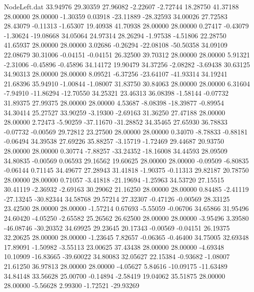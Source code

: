 \begin{filecontents}{NodeLeft.dat}
  33.94976   29.30359   27.96082    -2.22607   -2.72744   18.28750   41.37188   28.00000   28.00000   -1.30359    0.03918  -23.11889  -28.32593
  34.00026   27.72583   28.43079    -0.11313   -1.65307   19.40938   41.70938   28.00000   28.00000    0.27417   -0.43079   -1.30624  -19.08668
  34.05064   24.97314   28.26294    -1.97538   -4.51806   22.28750   41.65937   28.00000   28.00000    3.02686   -0.26294  -22.08108  -50.50358
  34.09109   22.08679   30.31006    -0.04151   -0.04151   26.32500   39.70312   28.00000   28.00000    5.91321   -2.31006   -0.45896   -0.45896
  34.14172   19.90479   34.37256    -2.08282   -3.69438   30.63125   34.90313   28.00000   28.00000    8.09521   -6.37256  -23.64107  -41.93314
  34.19241   21.68396   35.94910    -1.00844   -1.08007   31.83750   30.84063   28.00000   28.00000    6.31604   -7.94910  -11.86294  -12.70550
  34.25321   23.46313   36.08398    -1.58144   -0.07732   31.89375   27.99375   28.00000   28.00000    4.53687   -8.08398  -18.39877   -0.89954
  34.30414   25.27527   33.90259    -3.19300   -2.69163   31.36250   27.47188   28.00000   28.00000    2.72473   -5.90259  -37.11670  -31.28852
  34.35465   27.65930   36.78833    -0.07732   -0.00569   29.72812   23.27500   28.00000   28.00000    0.34070   -8.78833   -0.88181   -0.06494
  34.39538   27.69226   35.88257    -3.15719   -1.72469   29.44687   20.93750   28.00000   28.00000    0.30774   -7.88257  -33.24352  -18.16008
  34.44593   28.09509   34.80835    -0.00569    0.06593   29.16562   19.60625   28.00000   28.00000   -0.09509   -6.80835   -0.06144    0.71145
  34.49677   27.28943   31.41818    -1.90375   -0.11313   29.82187   20.78750   28.00000   28.00000    0.71057   -3.41818  -21.19694   -1.25963
  34.53720   27.15515   30.41119    -2.36932   -2.69163   30.29062   21.16250   28.00000   28.00000    0.84485   -2.41119  -27.13245  -30.82344
  34.58768   29.57214   27.32307    -0.47126   -0.00569   28.33125   23.42500   28.00000   28.00000   -1.57214    0.67693   -5.55059   -0.06706
  34.65866   31.95496   24.60420    -4.05250   -2.65582   25.26562   26.62500   28.00000   28.00000   -3.95496    3.39580  -46.08746  -30.20352
  34.69925   29.23645   20.17343    -0.00569   -0.04151   26.19375   32.20625   28.00000   28.00000   -1.23645    7.82657   -0.06365   -0.46400
  34.75005   32.69348   17.89091    -1.50982   -3.55113   23.00625   37.43438   28.00000   28.00000   -4.69348   10.10909  -16.83665  -39.60022
  34.80083   32.05627   22.15384    -0.93682   -1.08007   21.61250   36.97813   28.00000   28.00000   -4.05627    5.84616  -10.09175  -11.63489
  34.84148   33.56628   25.00700    -0.14894   -2.58419   19.04062   35.51875   28.00000   28.00000   -5.56628    2.99300   -1.72521  -29.93269

\end{filecontents}
